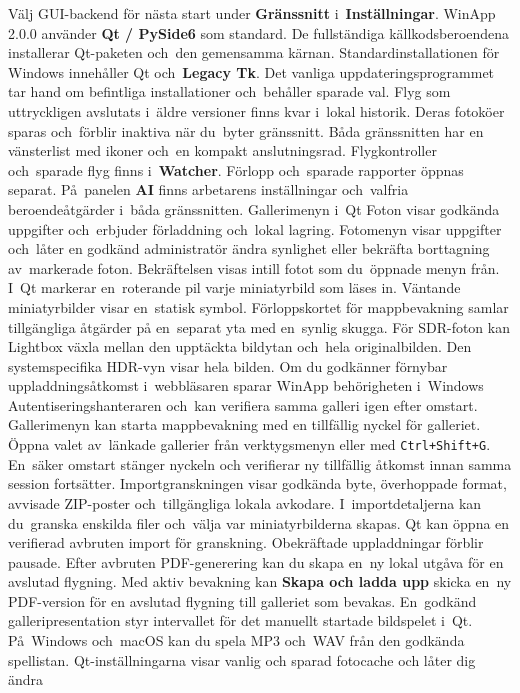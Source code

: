 \documentclass[11pt,a4paper]{article}
\newcommand{\ui}[1]{\textbf{#1}}
\newcommand{\codeword}[1]{\nolinkurl{#1}}
\begin{document}
Välj GUI-backend för nästa start under \ui{Gränssnitt} i~\ui{Inställningar}.
WinApp 2.0.0 använder \ui{Qt / PySide6} som standard.
De fullständiga källkodsberoendena installerar Qt-paketen och~den gemensamma kärnan.
Standardinstallationen för Windows innehåller Qt och~\ui{Legacy Tk}.
Det vanliga uppdateringsprogrammet tar hand om befintliga installationer
och~behåller sparade val.
Flyg som uttryckligen avslutats i~äldre versioner finns kvar i~lokal historik.
Deras fotoköer sparas och~förblir inaktiva när du~byter gränssnitt.
Båda gränssnitten har en vänsterlist med ikoner och~en kompakt anslutningsrad.
Flygkontroller och~sparade flyg finns i~\ui{Watcher}.
Förlopp och~sparade rapporter öppnas separat. På~panelen \ui{AI} finns
arbetarens inställningar och~valfria beroendeåtgärder i~båda gränssnitten.
Gallerimenyn i~Qt Foton visar godkända uppgifter och~erbjuder förladdning
och~lokal lagring. Fotomenyn visar uppgifter och~låter en godkänd administratör
ändra synlighet eller bekräfta borttagning av~markerade foton.
Bekräftelsen visas intill fotot som du~öppnade menyn från.
I~Qt markerar en~roterande pil varje miniatyrbild som läses in. Väntande
miniatyrbilder visar en~statisk symbol. Förloppskortet för mappbevakning
samlar tillgängliga åtgärder på en~separat yta med en~synlig skugga.
För SDR-foton kan Lightbox växla mellan den upptäckta bildytan och~hela
originalbilden. Den systemspecifika HDR-vyn visar hela bilden.
Om du godkänner förnybar uppladdningsåtkomst i~webbläsaren sparar WinApp
behörigheten i~Windows Autentiseringshanteraren och~kan verifiera samma galleri
igen efter omstart.
Gallerimenyn kan starta mappbevakning med en tillfällig nyckel för galleriet.
Öppna valet av~länkade gallerier från verktygsmenyn eller med
\codeword{Ctrl+Shift+G}.
En~säker omstart stänger nyckeln och verifierar ny tillfällig åtkomst innan
samma session fortsätter.
Importgranskningen visar godkända byte, överhoppade format, avvisade ZIP-poster
och~tillgängliga lokala avkodare. I~importdetaljerna kan du~granska enskilda
filer och~välja var miniatyrbilderna skapas.
Qt kan öppna en verifierad avbruten import för granskning. Obekräftade
uppladdningar förblir pausade. Efter avbruten PDF-generering kan du skapa
en~ny lokal utgåva för en avslutad flygning.
Med aktiv bevakning kan \ui{Skapa och ladda upp} skicka en~ny PDF-version
för en avslutad flygning till galleriet som bevakas.
En~godkänd galleripresentation styr intervallet för det manuellt startade
bildspelet i~Qt. På~Windows och~macOS kan du spela MP3 och~WAV från den
godkända spellistan.
Qt-inställningarna visar vanlig och sparad fotocache och låter dig ändra
\end{document}
